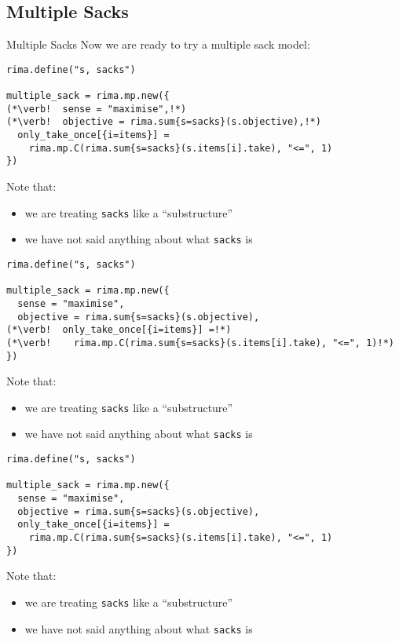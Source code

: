 \documentclass[smaller]{beamer}
\begin{document}
\subsection{Multiple Sacks}
\begin{frame}[fragile]{Multiple Sacks}
  Now we are ready to try a multiple sack model:
  \vspace{-2ex}
  \begin{overprint}%
%
  \begin{lstlisting}
rima.define("s, sacks")

multiple_sack = rima.mp.new({
(*\verb!  sense = "maximise",!*)
(*\verb!  objective = rima.sum{s=sacks}(s.objective),!*)
  only_take_once[{i=items}] =
    rima.mp.C(rima.sum{s=sacks}(s.items[i].take), "<=", 1)
})
  \end{lstlisting}
  Note that:
  \begin{itemize}
    \item we are treating \lstinline!sacks! like a ``substructure''
    \item we have not said anything about what \lstinline!sacks! is
   \end{itemize}

  \begin{lstlisting}
rima.define("s, sacks")

multiple_sack = rima.mp.new({
  sense = "maximise",
  objective = rima.sum{s=sacks}(s.objective),
(*\verb!  only_take_once[{i=items}] =!*)
(*\verb!    rima.mp.C(rima.sum{s=sacks}(s.items[i].take), "<=", 1)!*)
})
  \end{lstlisting}
  Note that:
  \begin{itemize}
    \item we are treating \lstinline!sacks! like a ``substructure''
    \item we have not said anything about what \lstinline!sacks! is
   \end{itemize}

  \begin{lstlisting}
rima.define("s, sacks")

multiple_sack = rima.mp.new({
  sense = "maximise",
  objective = rima.sum{s=sacks}(s.objective),
  only_take_once[{i=items}] =
    rima.mp.C(rima.sum{s=sacks}(s.items[i].take), "<=", 1)
})
  \end{lstlisting}
  Note that:
  \begin{itemize}
    \item we are treating \lstinline!sacks! like a ``substructure''
    \item we have not said anything about what \lstinline!sacks! is
   \end{itemize}

  \end{overprint}
\end{frame}
\end{document}
